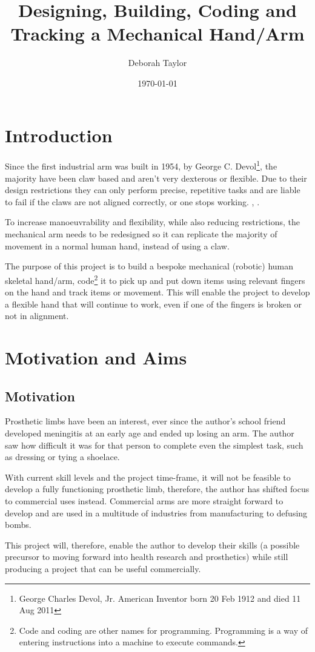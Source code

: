 \documentclass[progress]{cmpreport}
\title{Designing, Building, Coding and Tracking a Mechanical Hand/Arm}
\author{Deborah Taylor}
\date{\today}
\begin{document}
\section{Introduction}
Since the first industrial arm was built in 1954, by George C. Devol\footnote{George Charles Devol, Jr. American Inventor born 20 Feb 1912 and died 11 Aug 2011}, the majority have been claw based and aren't very dexterous or flexible. Due to their design restrictions they can only perform precise, repetitive tasks and are liable to fail if the claws are not aligned correctly, or one stops working. \citep{devol}, \citep{grigorediscovering}.  

To increase manoeuvrability and flexibility, while also reducing restrictions, the mechanical arm needs to be redesigned so it can replicate the majority of movement in a normal human hand, instead of using a claw. 

The purpose of this project is to build a bespoke mechanical (robotic) human skeletal hand/arm, code\footnote{Code and coding are other names for programming. Programming is a way of entering instructions into a machine to execute commands.} it to pick up and put down items using relevant fingers on the hand and track items or movement. This will enable the project to develop a flexible hand that will continue to work, even if one of the fingers is broken or not in alignment. 


\section{Motivation and Aims}
\subsection{Motivation}
 
Prosthetic limbs have been an interest, ever since the author's school friend developed meningitis at an early age and ended up losing an arm. The author saw how difficult it was for that person to complete even the simplest task, such as dressing or tying a shoelace. 

With current skill levels and the project time-frame, it will not be feasible to develop a fully functioning prosthetic limb, therefore, the author has shifted focus to commercial uses instead. Commercial arms are more straight forward to develop and are used in a multitude of industries from manufacturing to defusing bombs. 

This project will, therefore, enable the author to develop their skills (a possible precursor to moving forward into health research and prosthetics) while still producing a project that can be useful commercially.  
\end{document}
